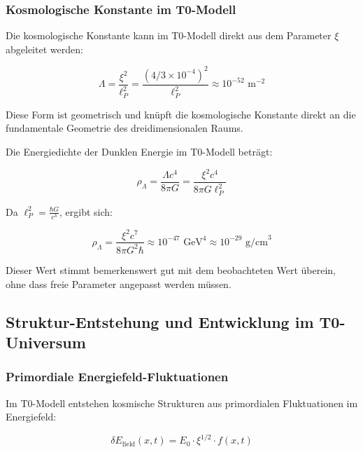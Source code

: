 \documentclass[12pt,a4paper]{article}
\theoremstyle{definition}
\begin{document}
\subsubsection{Kosmologische Konstante im T0-Modell}

Die kosmologische Konstante kann im T0-Modell direkt aus dem Parameter $\xi$ abgeleitet werden:

\begin{equation}
\boxed{\Lambda = \frac{\xi^2}{\ell_P^2} = \frac{(4/3 \times 10^{-4})^2}{\ell_P^2} \approx 10^{-52} \text{ m}^{-2}}
\end{equation}

Diese Form ist geometrisch und knüpft die kosmologische Konstante direkt an die fundamentale Geometrie des dreidimensionalen Raums.

\begin{verhaltnis}
Die Energiedichte der Dunklen Energie im T0-Modell beträgt:

\begin{equation}
	\rho_\Lambda = \frac{\Lambda c^4}{8\pi G} = \frac{\xi^2 c^4}{8\pi G \ell_P^2}
\end{equation}

Da $\ell_P^2 = \frac{\hbar G}{c^3}$, ergibt sich:

\begin{equation}
	\rho_\Lambda = \frac{\xi^2 c^7}{8\pi G^2 \hbar} \approx 10^{-47} \text{ GeV}^4 \approx 10^{-29} \text{ g/cm}^3
\end{equation}

Dieser Wert stimmt bemerkenswert gut mit dem beobachteten Wert überein, ohne dass freie Parameter angepasst werden müssen.
\end{verhaltnis}

\subsection{Struktur-Entstehung und Entwicklung im T0-Universum}

\subsubsection{Primordiale Energiefeld-Fluktuationen}

Im T0-Modell entstehen kosmische Strukturen aus primordialen Fluktuationen im Energiefeld:

\begin{equation}
\delta E_{\text{field}}(x,t) = E_0 \cdot \xi^{1/2} \cdot f(x,t)
\end{equation}
\end{document}
